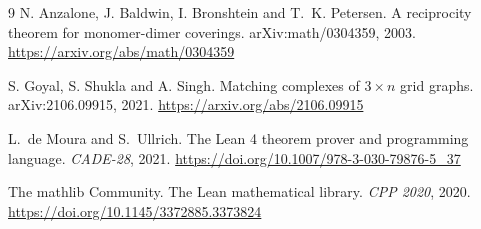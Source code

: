 \documentclass[11pt]{article}
\begin{document}
\begin{thebibliography}{9}
N. Anzalone, J. Baldwin, I. Bronshtein and T.~K. Petersen.
\newblock A reciprocity theorem for monomer-dimer coverings.
\newblock arXiv:math/0304359, 2003. \url{https://arxiv.org/abs/math/0304359}

S. Goyal, S. Shukla and A. Singh.
\newblock Matching complexes of $3 \times n$ grid graphs.
\newblock arXiv:2106.09915, 2021. \url{https://arxiv.org/abs/2106.09915}

L.~de Moura and S.~Ullrich.
\newblock The Lean 4 theorem prover and programming language.
\newblock \emph{CADE-28}, 2021. \url{https://doi.org/10.1007/978-3-030-79876-5_37}

The mathlib Community.
\newblock The Lean mathematical library.
\newblock \emph{CPP 2020}, 2020. \url{https://doi.org/10.1145/3372885.3373824}
\end{thebibliography}
\end{document}
